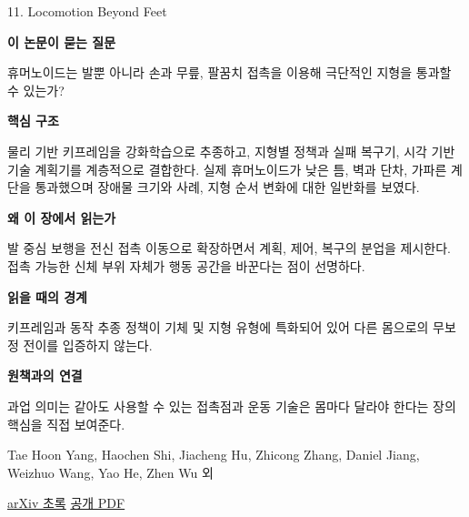 \documentclass[11pt,openany]{book}
\begin{document}
\begin{termcard}{11. Locomotion Beyond Feet}

\par

\medskip

{\sffamily\bfseries\color{deepblue} 이 논문이 묻는 질문}\par

휴머노이드는 발뿐 아니라 손과 무릎, 팔꿈치 접촉을 이용해 극단적인 지형을 통과할 수 있는가?

\smallskip

{\sffamily\bfseries\color{deepblue} 핵심 구조}\par

물리 기반 키프레임을 강화학습으로 추종하고, 지형별 정책과 실패 복구기, 시각 기반 기술 계획기를 계층적으로 결합한다. 실제 휴머노이드가 낮은 틈, 벽과 단차, 가파른 계단을 통과했으며 장애물 크기와 사례, 지형 순서 변화에 대한 일반화를 보였다.

\smallskip

{\sffamily\bfseries\color{deepblue} 왜 이 장에서 읽는가}\par

발 중심 보행을 전신 접촉 이동으로 확장하면서 계획, 제어, 복구의 분업을 제시한다. 접촉 가능한 신체 부위 자체가 행동 공간을 바꾼다는 점이 선명하다.

\smallskip

{\sffamily\bfseries\color{coral} 읽을 때의 경계}\par

키프레임과 동작 추종 정책이 기체 및 지형 유형에 특화되어 있어 다른 몸으로의 무보정 전이를 입증하지 않는다.

\smallskip

{\sffamily\bfseries\color{teal} 원책과의 연결}\par

과업 의미는 같아도 사용할 수 있는 접촉점과 운동 기술은 몸마다 달라야 한다는 장의 핵심을 직접 보여준다.

\medskip

{\footnotesize\color{muted} Tae Hoon Yang, Haochen Shi, Jiacheng Hu, Zhicong Zhang, Daniel Jiang, Weizhuo Wang, Yao He, Zhen Wu 외\par

\href{https://arxiv.org/abs/2601.03607}{arXiv 초록} \quad \href{https://arxiv.org/pdf/2601.03607}{공개 PDF}\par}

\end{termcard}
\end{document}
